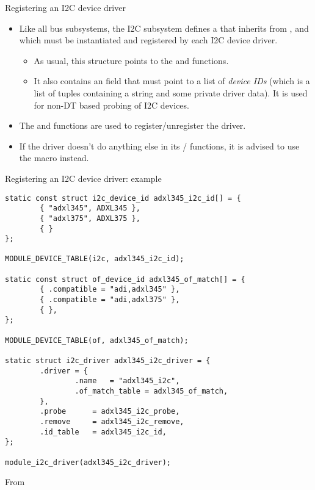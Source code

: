 \begin{frame}{Registering an I2C device driver}
  \begin{itemize}
  \item Like all bus subsystems, the I2C subsystem defines a
     that inherits from
    , and which must be instantiated and
    registered by each I2C device driver.
    \begin{itemize}
    \item As usual, this structure points to the  and
       functions.
    \item It also contains an  field that must point to a
      list of {\em device IDs} (which is a list of tuples containing a
      string and some private driver data). It is used for non-DT based
      probing of I2C devices.
    \end{itemize}
  \item The  and  functions
    are used to register/unregister the driver.
  \item If the driver doesn't do anything else in its
    / functions, it is advised to use
    the  macro instead.
  \end{itemize}
\end{frame}

\begin{frame}[fragile]{Registering an I2C device driver: example}
  \begin{block}{}
  \begin{verbatim}
static const struct i2c_device_id adxl345_i2c_id[] = {
        { "adxl345", ADXL345 },
        { "adxl375", ADXL375 },
        { }
};

MODULE_DEVICE_TABLE(i2c, adxl345_i2c_id);

static const struct of_device_id adxl345_of_match[] = {
        { .compatible = "adi,adxl345" },
        { .compatible = "adi,adxl375" },
        { },
};

MODULE_DEVICE_TABLE(of, adxl345_of_match);

static struct i2c_driver adxl345_i2c_driver = {
        .driver = {
                .name	= "adxl345_i2c",
                .of_match_table = adxl345_of_match,
        },
        .probe		= adxl345_i2c_probe,
        .remove		= adxl345_i2c_remove,
        .id_table	= adxl345_i2c_id,
};

module_i2c_driver(adxl345_i2c_driver);
\end{verbatim}
\end{block}
From 
\end{frame}

